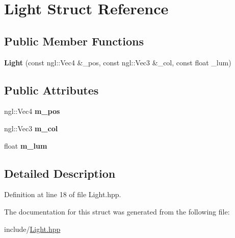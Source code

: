 \hypertarget{struct_light}{}\section{Light Struct Reference}
\label{struct_light}
\subsection*{Public Member Functions}
\begin{DoxyCompactItemize}
\item 
\hypertarget{struct_light_a90633b69642d18000a04a80d83f71609}{}{\bfseries Light} (const ngl\+::\+Vec4 \&\+\_\+pos, const ngl\+::\+Vec3 \&\+\_\+col, const float \+\_\+lum)\label{struct_light_a90633b69642d18000a04a80d83f71609}

\end{DoxyCompactItemize}
\subsection*{Public Attributes}
\begin{DoxyCompactItemize}
\item 
\hypertarget{struct_light_a35b73a1289dbb5c5ee4c0836464e0dc2}{}ngl\+::\+Vec4 {\bfseries m\+\_\+pos}\label{struct_light_a35b73a1289dbb5c5ee4c0836464e0dc2}

\item 
\hypertarget{struct_light_a8907dbb04fa5184b06e70a56ebb2a759}{}ngl\+::\+Vec3 {\bfseries m\+\_\+col}\label{struct_light_a8907dbb04fa5184b06e70a56ebb2a759}

\item 
\hypertarget{struct_light_ac73656afed4438e9cda234f6f5d532f9}{}float {\bfseries m\+\_\+lum}\label{struct_light_ac73656afed4438e9cda234f6f5d532f9}

\end{DoxyCompactItemize}


\subsection{Detailed Description}


Definition at line 18 of file Light.\+hpp.



The documentation for this struct was generated from the following file\+:\begin{DoxyCompactItemize}
\item 
include/\hyperlink{_light_8hpp}{Light.\+hpp}\end{DoxyCompactItemize}
